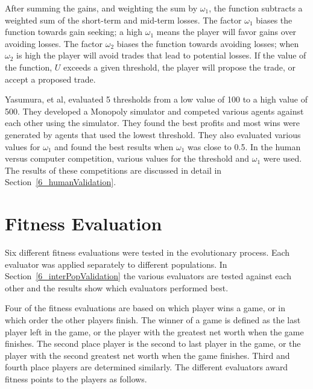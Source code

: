 After summing the gains, and weighting the sum by \(\omega_1\), the function
subtracts a weighted sum of the short-term and mid-term losses. The factor
\(\omega_1\) biases the function towards gain seeking; a high \(\omega_1\) means
the player will favor gains over avoiding losses. The factor \(\omega_2\) biases
the function towards avoiding losses; when \(\omega_2\) is high the player will
avoid trades that lead to potential losses. If the value of the function, \(U\)
exceeds a given threshold, the player will propose the trade, or accept a
proposed trade. 

Yasumura, et al, evaluated 5 thresholds from a low value of 100 to a high value
of 500. They developed a Monopoly simulator and competed various agents against
each other using the simulator. They found the best profits and most wins were
generated by agents that used the lowest threshold. They also evaluated various
values for \(\omega_1\) and found the best results when \(\omega_1\) was close
to 0.5. In the human versus computer competition, various values for the
threshold and \(\omega_1\) were used. The results of these competitions are
discussed in detail in Section~\ref{6_humanValidation}.

\section{Fitness Evaluation} \label{5_fitnesseval}

Six different fitness evaluations were tested in the evolutionary process. Each
evaluator was applied separately to different populations. In
Section~\ref{6_interPopValidation} the various evaluators are tested against
each other and the results show which evaluators performed best.

Four of the fitness evaluations are based on which player wins a game, or in
which order the other players finish. The winner of a game is defined as the
last player left in the game, or the player with the greatest net worth when the
game finishes. The second place player is the second to last player in the game,
or the player with the second greatest net worth when the game finishes. Third
and fourth place players are determined similarly. The different evaluators
award fitness points to the players as follows.

